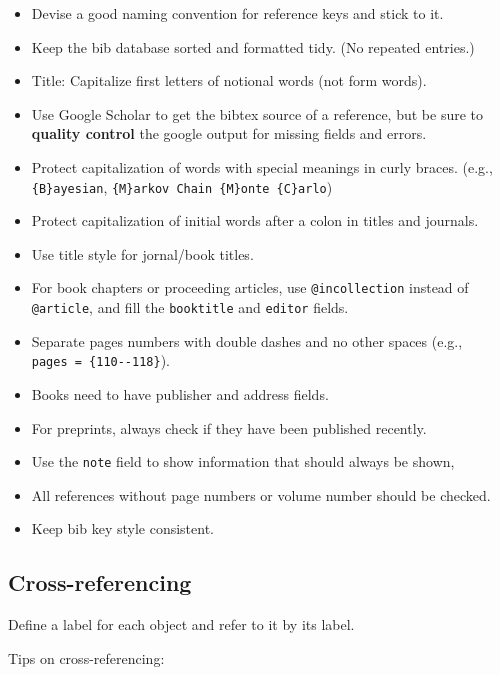 \documentclass[
]{book}
\providecommand{\tightlist}{%
  \setlength{\itemsep}{0pt}\setlength{\parskip}{0pt}}
\theoremstyle{definition}
\theoremstyle{definition}
\theoremstyle{definition}
\theoremstyle{definition}
\theoremstyle{remark}
\begin{document}
\begin{itemize}
\tightlist
\item
  Devise a good naming convention for reference keys and stick to it.
\item
  Keep the bib database sorted and formatted tidy. (No repeated entries.)
\item
  Title: Capitalize first letters of notional words (not form words).
\item
  Use Google Scholar to get the bibtex source of a reference, but be sure to
  \textbf{quality control} the google output for missing fields and errors.
\item
  Protect capitalization of words with special meanings in curly braces.
  (e.g., \texttt{\{B\}ayesian}, \texttt{\{M\}arkov\ Chain\ \{M\}onte\ \{C\}arlo})
\item
  Protect capitalization of initial words after a colon in titles and journals.
\item
  Use title style for jornal/book titles.
\item
  For book chapters or proceeding articles, use \texttt{@incollection} instead of
  \texttt{@article}, and fill the \texttt{booktitle} and \texttt{editor} fields.
\item
  Separate pages numbers with double dashes and no other spaces (e.g.,
  \texttt{pages\ =\ \{110-\/-118\}}).
\item
  Books need to have publisher and address fields.
\item
  For preprints, always check if they have been published recently.
\item
  Use the \texttt{note} field to show information that should always be shown,
\item
  All references without page numbers or volume number should be checked.
\item
  Keep bib key style consistent.
\end{itemize}

\subsection{Cross-referencing}\label{cross-referencing}

Define a label for each object and refer to it by its label.

Tips on cross-referencing:
\end{document}
